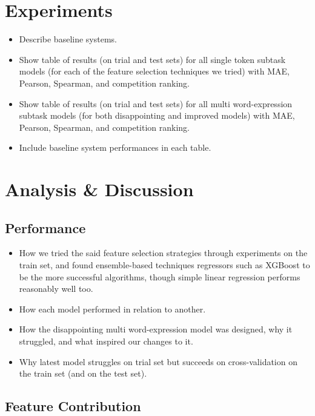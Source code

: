 \documentclass[11pt,a4paper]{article}
\begin{document}
\section{Experiments}

\begin{itemize}
  \item Describe baseline systems.
  \item Show table of results (on trial and test sets) for all single token subtask models (for each of the feature selection techniques we tried) with MAE, Pearson, Spearman, and competition ranking.
  \item Show table of results (on trial and test sets) for all multi word-expression subtask models (for both disappointing and improved models) with MAE, Pearson, Spearman, and competition ranking.
  \item Include baseline system performances in each table.
\end{itemize}

\section{Analysis \& Discussion}

\subsection{Performance}

\begin{itemize}
  \item How we tried the said feature selection strategies through experiments on the train set, and found ensemble-based techniques regressors such as XGBoost to be the more successful algorithms, though simple linear regression performs reasonably well too.
  \item How each model performed in relation to another.
  \item How the disappointing multi word-expression model was designed, why it struggled, and what inspired our changes to it.
  \item Why latest model struggles on trial set but succeeds on cross-validation on the train set (and on the test set).
\end{itemize}

\subsection{Feature Contribution}
\end{document}
